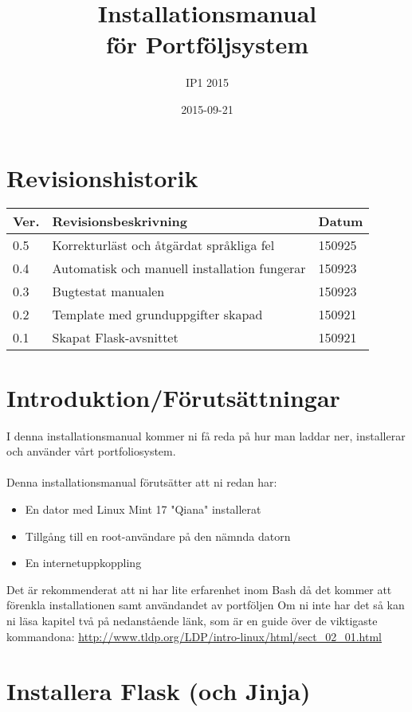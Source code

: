 \documentclass{TDP003mall}
\author{IP1 2015}
\title{Installationsmanual \\för Portföljsystem}
\date{2015-09-21}
\begin{document}
\projectpage
\section{Revisionshistorik}
\begin{table}[!h]
\begin{tabularx}{\linewidth}{|l|X|l|}\hline
Ver. & Revisionsbeskrivning & Datum \\\hline
0.5 & Korrekturläst och åtgärdat språkliga fel & 150925\\\hline
0.4 & Automatisk och manuell installation fungerar & 150923\\\hline
0.3 & Bugtestat manualen & 150923 \\\hline
0.2 & Template med grunduppgifter skapad & 150921 \\\hline
0.1 & Skapat Flask-avsnittet  & 150921 \\\hline




\end{tabularx}
\end{table}

\section{Introduktion/Förutsättningar}

I denna installationsmanual kommer ni få reda på hur man laddar ner, installerar och använder vårt portfoliosystem.\\\\Denna installationsmanual förutsätter att ni redan har:

\begin{itemize}
  \item En dator med Linux Mint 17 "Qiana" installerat
  \item Tillgång till en root-användare på den nämnda datorn
  \item En internetuppkoppling
\end{itemize}Det är rekommenderat att ni har lite erfarenhet inom Bash då det kommer att förenkla installationen samt användandet av portföljen
Om ni inte har det så kan ni läsa kapitel två på nedanstående länk, som är en guide över de viktigaste kommandona: 
\url{http://www.tldp.org/LDP/intro-linux/html/sect_02_01.html}

\section{Installera Flask (och Jinja)}
\end{document}
